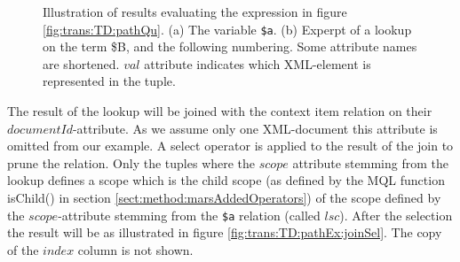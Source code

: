 \begin{myExample}
\begin{figure}[h]
\centering
{}
\qquad
{}
\caption[Evaluating the expression of figure \ref{fig:trans:TD:pathQu}]{Illustration of results evaluating the
expression in figure \ref{fig:trans:TD:pathQu}. (a) The variable \texttt{\$a}. (b) Experpt of a lookup on the term
\textsf{\$B}, and the following numbering. Some attribute names are shortened. $val$ attribute indicates which
XML-element is represented in the tuple.
\label{fig:trans:TD:pathEx}}
\end{figure}

The result of the lookup will be joined with the context item relation on their $documentId$-attribute. As we
assume only one XML-document this attribute is omitted from our example. A \textsf{select} operator is applied to
the result of the join to prune the relation. Only the tuples where the $scope$ attribute stemming from the lookup
defines a scope which is the child scope (as defined by the MQL function \textsf{isChild() in section
\ref{sect:method:marsAddedOperators}}) of the scope defined by the $scope$-attribute stemming from the
\texttt{\$a} relation (called $lsc$). After the selection the result will be as illustrated in figure
\ref{fig:trans:TD:pathEx:joinSel}. The copy of the $index$ column is not shown.


\end{myExample}
